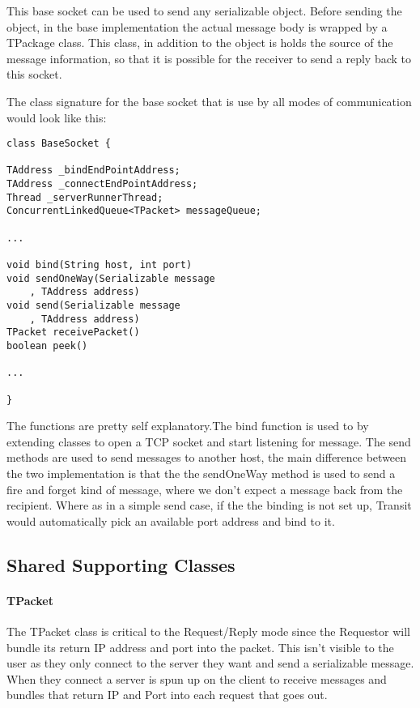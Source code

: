 \documentclass[10pt,journal,compsoc]{IEEEtran}
\begin{document}
This base socket can be used to send any serializable object. Before sending the object, in the base implementation the actual message body is wrapped by a TPackage class. This class, in addition to the object is holds the source of the message information, so that it is possible for the receiver to send a reply back to this socket.

The class signature for the base socket that is use by all modes of communication would look like this:
\begin{lstlisting}
class BaseSocket {

TAddress _bindEndPointAddress;
TAddress _connectEndPointAddress;
Thread _serverRunnerThread;
ConcurrentLinkedQueue<TPacket> messageQueue;

...

void bind(String host, int port)
void sendOneWay(Serializable message
    , TAddress address)
void send(Serializable message
    , TAddress address)
TPacket receivePacket()
boolean peek()

...

}

\end{lstlisting}


The functions are pretty self explanatory.The bind function is used to by extending classes to open a TCP socket and start listening for message. The send methods are used to send messages to another host, the main difference between the two implementation is that the the sendOneWay method is used to send a fire and forget kind of message, where we don't expect a message back from the recipient. Where as in a simple send case, if the the binding is not set up, Transit would automatically pick an available port address and bind to it.

\subsection{Shared Supporting Classes}

\paragraph{TPacket}
The TPacket class is critical to the Request/Reply mode since the Requestor will bundle its return IP address and port into the packet. This isn't visible to the user as they only connect to the server they want and send a serializable message. When they connect a server is spun up on the client to receive messages and bundles that return IP and Port into each request that goes out.
\end{document}
